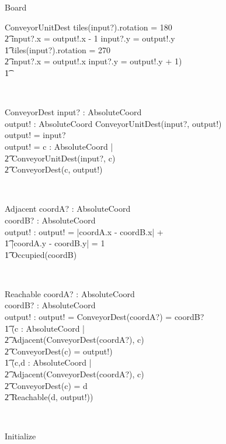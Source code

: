 \documentclass[12pt]{article}
\begin{document}
\begin{class}{Board}
\begin{schema}{ConveyorUnitDest}
        tiles(input?).rotation = 180 \Rightarrow \\ \t2 input?.x = output!.x - 1 \wedge input?.y = output!.y \\ \t1
        tiles(input?).rotation = 270 \Rightarrow \\ \t2 input?.x = output!.x \wedge input?.y = output!.y + 1) \\ \t1
\end{schema} \\
\znewpage
\begin{schema}{ConveyorDest}
input? : AbsoluteCoord \\
output! : AbsoluteCoord
\where
\IF ConveyorUnitDest(input?, output!) \\
\THEN output! = input? \\
\ELSE output! = \exists c : AbsoluteCoord | \\ \t2 ConveyorUnitDest(input?, c) \\ \t2 ConveyorDest(c, output!)
\end{schema} \\
\begin{schema}{Adjacent}
coordA? : AbsoluteCoord \\
coordB? : AbsoluteCoord \\
output! : \bool
\where
output! = |\!coordA.x - coordB.x\!| + \\ \t1 |\!coordA.y - coordB.y\!| = 1 \\ \t1
\neg Occupied(coordB)
\end{schema} \\
\begin{schema}{Reachable}
coordA? : AbsoluteCoord \\
coordB? : AbsoluteCoord \\
output! : \bool
\where
output! = ConveyorDest(coordA?) = coordB? \: \vee \\ \t1 (\exists c : AbsoluteCoord | \\ \t2 Adjacent(ConveyorDest(coordA?), c) \: \wedge \\ \t2 ConveyorDest(c) = output!) \: \vee \\ \t1
(\exists c,d : AbsoluteCoord | \\ \t2 Adjacent(ConveyorDest(coordA?), c) \: \wedge \\ \t2 ConveyorDest(c) = d \: \wedge \\ \t2 Reachable(d, output!))
\end{schema} \\
\znewpage
\begin{schema}{Initialize}

\end{schema}
\end{class}
\end{document}
